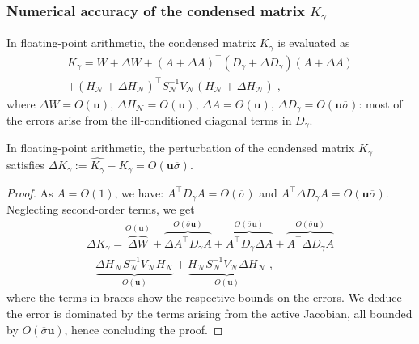 \documentclass[smallextended]{svjour3}
\newcommand{\epstol}{\mathbf{u}}
\newcommand{\cinactive}{\mathcal{N}}
\begin{document}
\subsubsection{Numerical accuracy of the condensed matrix $K_\gamma$}
In floating-point arithmetic, the condensed matrix $K_\gamma$ is evaluated as
\begin{multline*}
  \widehat{K}_\gamma = W + \Delta W + (A + \Delta A)^\top (D_\gamma + \Delta D_\gamma) (A + \Delta A) \\
  + (H_{\cinactive} + \Delta H_{\cinactive})^\top S_{\cinactive}^{-1} V_{\cinactive} (H_{\cinactive} + \Delta H_{\cinactive}) \; ,
\end{multline*}
where $\Delta W = O(\epstol)$, $\Delta H_{\cinactive}  = O(\epstol)$, $ \Delta A  = \Theta(\epstol)$,
$\Delta D_\gamma = O(\epstol \overline{\sigma})$: most
of the errors arise from the ill-conditioned diagonal terms in $D_\gamma$.
\begin{proposition}
  \label{prop:cond:boundcondensedmatrix}
  In floating-point arithmetic, the perturbation
  of the condensed matrix $K_\gamma$ satisfies
  $\Delta K_\gamma := \widehat{K_\gamma} - K_\gamma  = O(\epstol \overline{\sigma})$.
\end{proposition}
\begin{proof}
  As $A = \Theta(1)$, we have:
 $A^\top D_\gamma A = \Theta(\overline{\sigma})$ and
  $A^\top \Delta D_\gamma A = O(\epstol \overline{\sigma})$.
  Neglecting second-order terms, we get
  \begin{multline*}
    \Delta K_\gamma =
    \overbrace{\Delta W}^{O(\epstol)}
    + \overbrace{\Delta A^\top D_\gamma A}^{O(\overline{\sigma}\epstol)}
    + \overbrace{A^\top D_\gamma \Delta A}^{O(\overline{\sigma}\epstol)}
    + \overbrace{A^\top \Delta D_\gamma A}^{O(\overline{\sigma}\epstol)}  \\
    + \underbrace{\Delta H_{\cinactive} S_{\cinactive}^{-1} V_{\cinactive} H_{\cinactive}}_{O(\epstol)}
    + \underbrace{H_{\cinactive} S_{\cinactive}^{-1} V_{\cinactive} \Delta H_{\cinactive} }_{O(\epstol)}
      \; ,
  \end{multline*}
  where the terms in braces show the respective bounds on the errors.
  We deduce the error is dominated by the terms arising from the active Jacobian,
  all bounded by $O(\overline{\sigma} \epstol)$, hence concluding the proof.
\end{proof}
\end{document}
